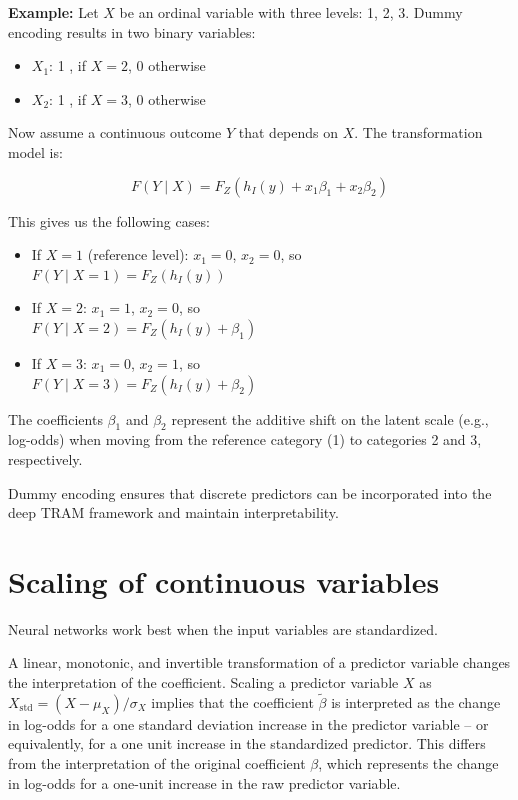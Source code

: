 \vspace{1em}
\noindent
\textbf{Example:} Let $X$ be an ordinal variable with three levels: 1, 2, 3. Dummy encoding results in two binary variables:
\begin{itemize}
  \item $X_1$: 1 , if $X = 2$, 0 otherwise
  \item $X_2$: 1 , if $X = 3$, 0 otherwise
\end{itemize}

Now assume a continuous outcome $Y$ that depends on $X$. The transformation model is:

\[
F(Y \mid X) = F_Z(h_I(y) + x_1 \beta_1 + x_2 \beta_2)
\]

This gives us the following cases:
\begin{itemize}
  \item If $X = 1$ (reference level): $x_1 = 0$, $x_2 = 0$, so \\
  $F(Y \mid X=1) = F_Z(h_I(y))$
  \item If $X = 2$: $x_1 = 1$, $x_2 = 0$, so \\
  $F(Y \mid X=2) = F_Z(h_I(y) + \beta_1)$
  \item If $X = 3$: $x_1 = 0$, $x_2 = 1$, so \\
  $F(Y \mid X=3) = F_Z(h_I(y) + \beta_2)$
\end{itemize}

The coefficients $\beta_1$ and $\beta_2$ represent the additive shift on the latent scale (e.g., log-odds) when moving from the reference category (1) to categories 2 and 3, respectively.

Dummy encoding ensures that discrete predictors can be incorporated into the deep TRAM framework and maintain interpretability.



\section{Scaling of continuous variables} \label{sec:scaling_continuous_variables}

Neural networks work best when the input variables are standardized. 

A linear, monotonic, and invertible transformation of a predictor variable changes the interpretation of the coefficient. Scaling a predictor variable $X$ as $X_{\text{std}} = (X - \mu_X) / \sigma_X$ implies that the coefficient $\tilde{\beta}$ is interpreted as the change in log-odds for a one standard deviation increase in the predictor variable -- or equivalently, for a one unit increase in the standardized predictor. This differs from the interpretation of the original coefficient $\beta$, which represents the change in log-odds for a one-unit increase in the raw predictor variable.


